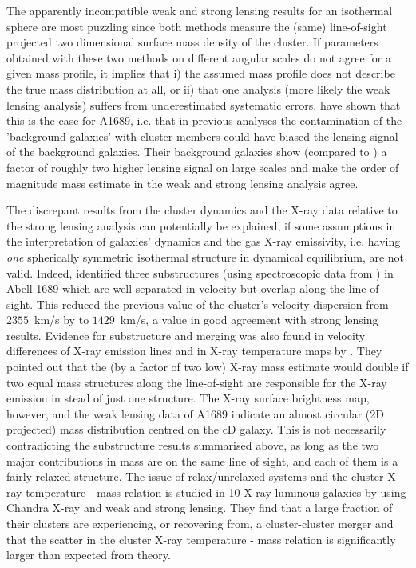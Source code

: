 \documentclass[useAMS,usenatbib]{mn2e}
\newcounter{one}   \setcounter{one}{1}
\newcounter{two}   \setcounter{two}{2}
\newcounter{three} \setcounter{three}{3}
\begin{document}
The apparently incompatible weak and strong lensing results for an
isothermal sphere are most puzzling since both methods measure the
(same) line-of-sight projected two dimensional surface mass density of
the cluster. If parameters obtained with these two methods on
different angular scales do not agree for a given mass profile, it
implies that i) the assumed mass profile does not describe the true
mass distribution at all, or ii) that one analysis (more likely the
weak lensing analysis) suffers from underestimated systematic errors.
\citet{broadhurst:05} have shown that this is the case for A1689,
i.e. that in previous analyses the contamination of the 'background
galaxies' with cluster members could have biased the lensing signal of
the background galaxies. Their background galaxies show (compared to
\citet{clowe:01,king:02b}) a factor of roughly two higher lensing
signal on large scales and make the order of magnitude mass estimate
in the weak and strong lensing analysis agree.

The discrepant results from the cluster dynamics and the \mbox{X-ray}
data relative to the strong lensing analysis can potentially be
explained, if some assumptions in the interpretation of galaxies'
dynamics and the gas \mbox{X-ray} emissivity, i.e. having {\it one}
spherically symmetric isothermal structure in dynamical equilibrium,
are not valid. Indeed, \citet{girardi:97} identified three
substructures (using spectroscopic data from \citet{teague:90}) in
Abell 1689 which are well separated in velocity but overlap along the
line of sight. This reduced the previous value of the cluster's
velocity dispersion from $2355$~km/s by \citet{teague:90} to
$1429$~km/s, a value in good agreement with strong lensing
results. Evidence for substructure and merging was also found in
velocity differences of \mbox{X-ray} emission lines and in
\mbox{X-ray} temperature maps by \citet{andersson:04}. They pointed
out that the (by a factor of two low) \mbox{X-ray} mass estimate would
double if two equal mass structures along the line-of-sight are
responsible for the \mbox{X-ray} emission in stead of just one
structure.  The \mbox{X-ray} surface brightness map, however, and the
weak lensing data of A1689 indicate an almost circular (2D projected)
mass distribution centred on the cD galaxy. This is not necessarily
contradicting the substructure results summarised above, as long as
the two major contributions in mass are on the same line of sight, and
each of them is a fairly relaxed structure. The issue of
relax/unrelaxed systems and the cluster \mbox{X-ray} temperature -
mass relation is studied in 10 \mbox{X-ray} luminous galaxies by
\citet{smith:05} using Chandra \mbox{X-ray} and weak and strong
lensing. They find that a large fraction of their clusters are
experiencing, or recovering from, a cluster-cluster merger and that
the scatter in the cluster \mbox{X-ray} temperature - mass relation is
significantly larger than expected from theory.
\end{document}
